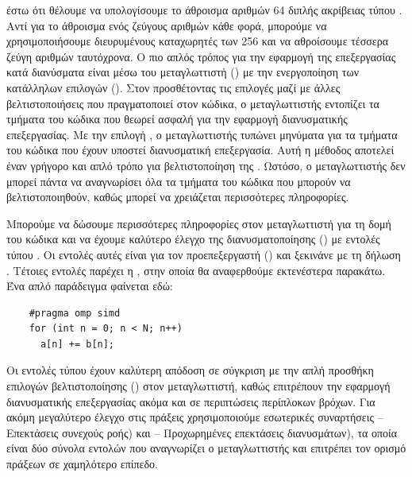 έστω ότι θέλουμε να υπολογίσουμε το άθροισμα αριθμών 64 διπλής ακρίβειας τύπου . Αντί για το άθροισμα ενός ζεύγους αριθμών κάθε φορά, μπορούμε να χρησιμοποιήσουμε διευρυμένους καταχωρητές των 256 και να αθροίσουμε τέσσερα ζεύγη αριθμών ταυτόχρονα.
Ο πιο απλός τρόπος για την εφαρμογή της επεξεργασίας κατά διανύσματα είναι μέσω του μεταγλωττιστή () με την ενεργοποίηση των κατάλληλων επιλογών (). Στον  προσθέτοντας τις επιλογές  μαζί με άλλες βελτιστοποιήσεις που πραγματοποιεί στον κώδικα, ο μεταγλωττιστής εντοπίζει τα τμήματα του κώδικα που θεωρεί ασφαλή για την εφαρμογή διανυσματικής επεξεργασίας. Με την επιλογή , ο μεταγλωττιστής τυπώνει μηνύματα για τα τμήματα του κώδικα που έχουν υποστεί διανυσματική επεξεργασία. Αυτή η μέθοδος αποτελεί έναν γρήγορο και απλό τρόπο για βελτιστοποίηση της . Ωστόσο, ο μεταγλωττιστής δεν μπορεί πάντα να αναγνωρίσει όλα τα τμήματα του κώδικα που μπορούν να βελτιστοποιηθούν, καθώς μπορεί να χρειάζεται περισσότερες πληροφορίες.

Μπορούμε να δώσουμε περισσότερες πληροφορίες στον μεταγλωττιστή για τη δομή του κώδικα και να έχουμε καλύτερο έλεγχο της διανυσματοποίησης () με εντολές τύπου . Οι εντολές αυτές είναι για τον προεπεξεργαστή () και ξεκινάνε με τη δήλωση . Τέτοιες εντολές παρέχει η , στην οποία θα αναφερθούμε εκτενέστερα παρακάτω. Ένα απλό παράδειγμα φαίνεται εδώ:

\begin{center}
\begin{minipage}{0.5\textwidth}
\begin{verbatim}
    #pragma omp simd
    for (int n = 0; n < N; n++)
      a[n] += b[n];
\end{verbatim}
\end{minipage}
\end{center}

Οι εντολές τύπου  έχουν καλύτερη απόδοση σε σύγκριση με την απλή προσθήκη επιλογών βελτιστοποίησης () στον μεταγλωττιστή, καθώς επιτρέπουν την εφαρμογή διανυσματικής επεξεργασίας ακόμα και σε περιπτώσεις περίπλοκων βρόχων.
Για ακόμη μεγαλύτερο έλεγχο στις  πράξεις χρησιμοποιούμε εσωτερικές συναρτήσεις  – Επεκτάσεις  συνεχούς ροής) και  – Προχωρημένες επεκτάσεις διανυσμάτων), τα οποία είναι δύο σύνολα εντολών που αναγνωρίζει ο μεταγλωττιστής και επιτρέπει τον ορισμό πράξεων σε χαμηλότερο επίπεδο.

